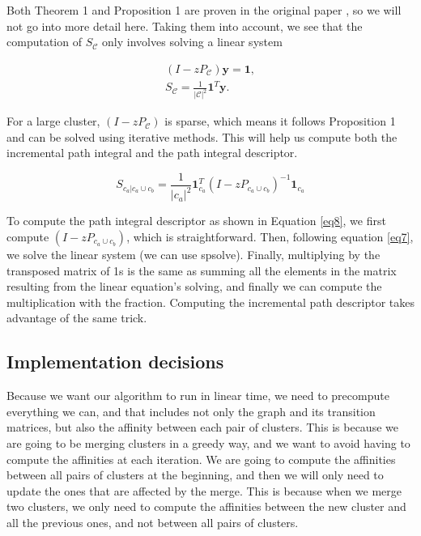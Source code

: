 \documentclass[
	10pt,
	parskip=half-,	
	paper=a4,
	english
	]{scrartcl}
\begin{document}
Both Theorem 1 and Proposition 1 are proven in the original paper \cite{citation1}, so we will not go into more detail here. Taking them into account, we see that the computation of $S_{\mathcal{C}}$ only involves solving a linear system

\begin{equation}
    \begin{split}
    (I - zP_{\mathcal{C}}) \mathbf{y} = \mathbf{1},
    \label{eq7}
    \\
    S_{\mathcal{C}} = \frac{1}{|\mathcal{C}|^2} \mathbf{1}^{T} \mathbf{y}.
    \end{split}
\end{equation}

For a large cluster, $(I - zP_{\mathcal{C}})$ is sparse, which means it follows Proposition 1 and can be solved using iterative methods. This will help us compute both the incremental path integral and the path integral descriptor.

\begin{equation}
    S_{c_a|c_a \cup c_b} = \frac{1}{|c_a|^2} \mathbf{1}_{c_a}^{T} (I - zP_{c_a \cup c_b})^{-1} \mathbf{1}_{c_a}
\end{equation}

To compute the path integral descriptor as shown in Equation \ref{eq8}, we first compute \((I - zP_{c_a \cup c_b})\), which is straightforward. Then, following equation \ref{eq7}, we solve the linear system (we can use spsolve). Finally, multiplying by the transposed matrix of 1s is the same as summing all the elements in the matrix resulting from the linear equation's solving, and finally we can compute the multiplication with the fraction. Computing the incremental path descriptor takes advantage of the same trick. 

\subsection{Implementation decisions}

Because we want our algorithm to run in linear time, we need to precompute everything we can, and that includes not only the graph and its transition matrices, but also the affinity between each pair of clusters. This is because we are going to be merging clusters in a greedy way, and we want to avoid having to compute the affinities at each iteration. We are going to compute the affinities between all pairs of clusters at the beginning, and then we will only need to update the ones that are affected by the merge. This is because when we merge two clusters, we only need to compute the affinities between the new cluster and all the previous ones, and not between all pairs of clusters.
\end{document}
